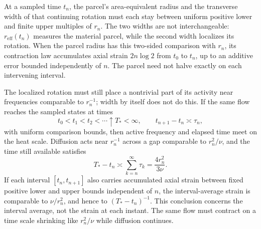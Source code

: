 At a sampled time \(t_n\), the parcel's area-equivalent radius and the transverse width of that continuing rotation must each stay between uniform positive lower and finite upper multiples of \(r_n\). The two widths are not interchangeable: \(r_{\mathrm{eff}}(t_n)\) measures the material parcel, while the second width localizes its rotation. When the parcel radius has this two-sided comparison with \(r_n\), its contraction law accumulates axial strain \(2n\log 2\) from \(t_0\) to \(t_n\), up to an additive error bounded independently of \(n\). The parcel need not halve exactly on each intervening interval.

The localized rotation must still place a nontrivial part of its activity near frequencies comparable to \(r_n^{-1}\); width by itself does not do this. If the same flow reaches the sampled states at times
\[
  t_0<t_1<t_2<\cdots\uparrow T_*<\infty,
  \qquad
  t_{n+1}-t_n\asymp\tau_n,
\]
with uniform comparison bounds, then active frequency and elapsed time meet on the heat scale. Diffusion acts near \(r_n^{-1}\) across a gap comparable to \(r_n^2/\nu\), and the time still available satisfies
\[
  T_*-t_n
  \asymp
  \sum_{k=n}^{\infty}\tau_k
  =
  \frac{4r_n^2}{3\nu}.
\]
If each interval \([t_n,t_{n+1}]\) also carries accumulated axial strain between fixed positive lower and upper bounds independent of \(n\), the interval-average strain is comparable to \(\nu/r_n^2\), and hence to \((T_*-t_n)^{-1}\). This conclusion concerns the interval average, not the strain at each instant. The same flow must contract on a time scale shrinking like \(r_n^2/\nu\) while diffusion continues.